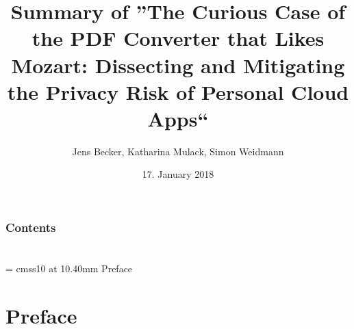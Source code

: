 \documentclass{beamer}
\title{Summary of ''The Curious Case of the PDF
Converter that Likes Mozart: Dissecting and Mitigating the Privacy Risk of Personal Cloud Apps``} %
\author{Jens Becker, Katharina Mulack, Simon Weidmann}
\institute{Security of complex Information systems}
\date{17. January 2018}
\begin{document}
{
\section*{}
\frame{\titlepage}
}

{
\section*{}
	\begin{frame}
	\frametitle{Contents}
      \tableofcontents    
\end{frame}
}

{
\section*{}
	\begin{frame}
      \begin{center}
        \font\endfont = cmss10 at 10.40mm
        \color{darkBlue}
        \endfont 
        \baselineskip 20.0mm   
        Preface 
      \end{center}    
\end{frame}
}

\section{Preface}


\end{document}
